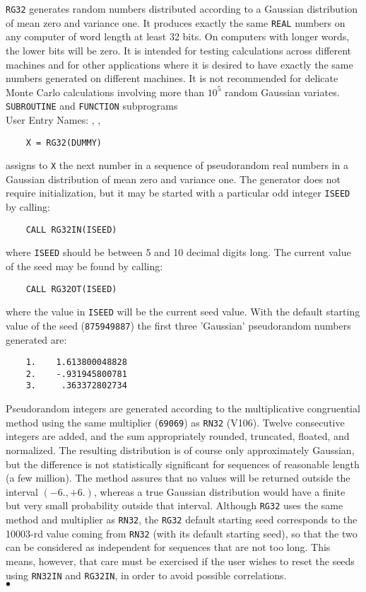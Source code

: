                             
                     
              
{\tt RG32} generates random numbers distributed according to a
Gaussian distribution of mean zero and variance one. It produces
exactly the same {\tt REAL} numbers on any computer of word length at
least 32 bits. On computers with longer words, the lower bits will
be zero. It is intended for testing calculations across different
machines and for other applications where it is desired to have
exactly the same numbers generated on different machines. It is
not recommended for delicate Monte Carlo calculations involving
more than $10^5$ random Gaussian variates.
\Structure
{\tt SUBROUTINE} and {\tt FUNCTION} subprograms \\
User Entry Names: , , 
\Usage
\begin{verbatim}
    X = RG32(DUMMY)
\end{verbatim}
assigns to {\tt X} the next number in a sequence of pseudorandom real
numbers in a Gaussian distribution of mean zero and variance one.
The generator does not require initialization, but it may be started
with a particular odd integer {\tt ISEED} by calling:
\begin{verbatim}
    CALL RG32IN(ISEED)
\end{verbatim}
where {\tt ISEED} should be between 5 and 10 decimal digits long.
The current value of the seed may be found by calling:
\begin{verbatim}
    CALL RG32OT(ISEED)
\end{verbatim}
where the value in {\tt ISEED} will be the current seed value.
With the default starting value of the seed ({\tt 875949887})
the first three 'Gaussian' pseudorandom numbers generated are:
\begin{verbatim}
    1.    1.613800048828
    2.    -.931945800781
    3.     .363372802734
\end{verbatim}
\Method
Pseudorandom integers are generated according to the multiplicative
congruential method using the same multiplier ({\tt 69069})
as {\tt RN32} (V106). Twelve consecutive integers are added, and the sum
appropriately rounded, truncated, floated, and normalized. The
resulting distribution is of course only approximately Gaussian, but
the difference is not statistically significant for sequences of
reasonable length (a few million). The method assures that no
values will be returned outside the interval $(-6.,+6.)$, whereas a true
Gaussian distribution would have a finite but very small probability
outside that interval.
\Notes
Although {\tt RG32} uses the same method and multiplier as {\tt RN32},
the {\tt RG32} default starting seed corresponds to the 10003-rd value
coming from {\tt RN32} (with its default starting seed), so that the two
can be considered as independent for sequences that are not too long.
This means, however, that care must be exercised if the user wishes to
reset the seeds using {\tt RN32IN} and {\tt RG32IN}, in order to avoid
possible correlations.
\\ $\bullet$
